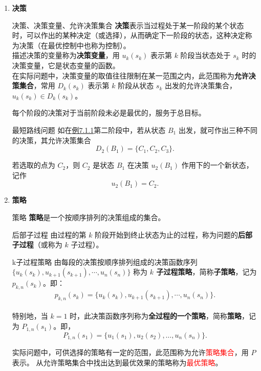 \begin{enumerate}
\begin{dfnbox}{状态的性质：无后效性}{}
	\label{dfn:无后效性}
	如果某阶段状态给定后，则在这阶段以后过程的发展不受这阶段以前各段状态的影响。
换句话说，过程的过去历史只能通过当前的状态去影响它未来的发展，当前的状态是以往历史的一个完整总结。
这个性质称为\textbf{无后效性（即马尔科夫性）}。不满足无后效性要求的量不能作为动态规划的状态。
\end{dfnbox}



\item{\textbf{决策}}
\begin{dfnbox}{决策、决策变量、允许决策集合}{}
	\label{允许决策集合}
	\textbf{决策}表示当过程处于某一阶段的某个状态时，可以作出的某种决定（或选择），从而确定下一阶段的状态，这种决定称为决策（在最优控制中也称为控制）。
\\描述决策的变量称为\textbf{决策变量}，用 \( u_k(s_k) \) 表示第 \( k \) 阶段当状态处于 \( s_k \) 时的决策变量，它是状态变量的函数。
\\在实际问题中，决策变量的取值往往限制在某一范围之内，此范围称为\textbf{允许决策集合}，常用 \( D_k(s_k) \) 表示第 \( k \) 阶段从状态 \( s_k \) 出发的允许决策集合，\( u_k(s_k) \in D_k(s_k) \)。
\end{dfnbox}
每个阶段的决策对于当前阶段未必是最优的，服务于总目标。
\begin{exbox}{最短路线问题}{}
如在\hyperref[eg:7.1.1]{例7.1.1}第二阶段中，若从状态 \( B_1 \) 出发，就可作出三种不同的决策，其允许决策集合
\[ D_2(B_1) = \{C_1, C_2, C_3\}. \]

若选取的点为 \( C_2 \)，则 \( C_2 \) 是状态 \( B_1 \) 在决策 \( u_2(B_1) \) 作用下的一个新状态，记作
\[ u_2(B_1) = C_2. \]
\end{exbox}

\item{\textbf{策略}}
\begin{dfnbox}{策略}{}
	\textbf{策略}是一个按顺序排列的决策组成的集合。
\end{dfnbox}
\begin{dfnbox}{后部子过程}{}
	由过程的第 \( k \) 阶段开始到终止状态为止的过程，称为问题的\textbf{后部子过程}（或称为 \( k \) 子过程）。
\end{dfnbox}
\begin{dfnbox}{k子过程策略}{}
	由每段的决策按顺序排列组成的决策函数序列 \(\{u_k(s_k), u_{k+1}(s_{k+1}), \cdots, u_n(s_n)\}\) 称为
	\textbf{\( k \) 子过程策略}，简称\textbf{子策略}，记为 \( p_{k,n}(s_k) \)。即：
\[ p_{k,n}(s_k) = \{u_k(s_k), u_{k+1}(s_{k+1}), \cdots, u_n(s_n)\}. \]
\\特别地，当 \( k = 1 \) 时，此决策函数序列称为\textbf{全过程的一个策略}，简称\textbf{策略}，记为 \( P_{1,n}(s_1) \)。即，
\[ P_{1,n}(s_1) = \{u_1(s_1), u_2(s_2), \ldots, u_n(s_n)\}. \]
\end{dfnbox}
实际问题中，可供选择的策略有一定的范围，此范围称为允许\textcolor{red}{策略集合}，用 \( P \) 表示。
从允许策略集合中找出达到最优效果的策略称为\textcolor{red}{最优策略}。


\end{enumerate}

